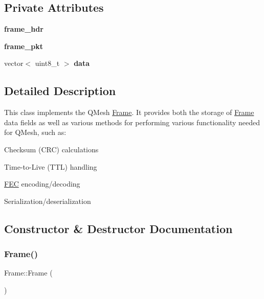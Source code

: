 \subsection*{Private Attributes}
\begin{DoxyCompactItemize}
\item 
\mbox{\label{classFrame_aaaf5414ab06dbc255a62733d927807f4}} 
{\bfseries frame\+\_\+hdr}
\item 
\mbox{\label{classFrame_a567a07ca040d22e622bfe70936aaddc7}} 
{\bfseries frame\+\_\+pkt}
\item 
\mbox{\label{classFrame_a0af26264fb9334282af8ad0ab6253bf0}} 
vector$<$ uint8\+\_\+t $>$ {\bfseries data}
\end{DoxyCompactItemize}


\subsection{Detailed Description}
This class implements the Q\+Mesh \hyperlink{classFrame}{Frame}. It provides both the storage of \hyperlink{classFrame}{Frame} data fields as well as various methods for performing various functionality needed for Q\+Mesh, such as\+:
\begin{DoxyItemize}
\item Checksum (C\+RC) calculations
\item Time-\/to-\/\+Live (T\+TL) handling
\item \hyperlink{classFEC}{F\+EC} encoding/decoding
\item Serialization/deserialization 
\end{DoxyItemize}

\subsection{Constructor \& Destructor Documentation}
\mbox{\label{classFrame_ad2e5946cf41d4817e750500acf05d02b}} 
\subsubsection{\texorpdfstring{Frame()}{Frame()}\hspace{0.1cm}{\footnotesize\ttfamily [1/2]}}
{\footnotesize\ttfamily Frame\+::\+Frame (\begin{DoxyParamCaption}{ }\end{DoxyParamCaption})\hspace{0.3cm}{\ttfamily [inline]}}

